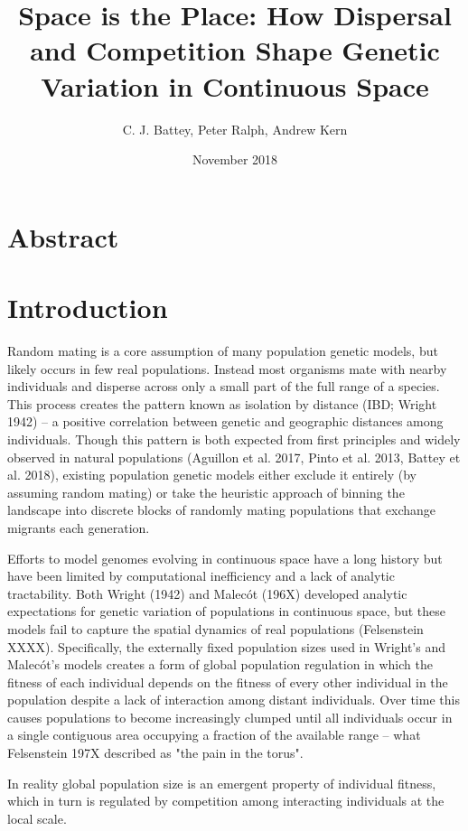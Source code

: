 \documentclass[12pt]{amsart}
\title{ Space is the Place: How Dispersal and Competition Shape Genetic Variation in Continuous Space }
\author{C. J. Battey, Peter Ralph, Andrew Kern}
\date{November 2018} %
\begin{document}
\maketitle
\tableofcontents

\section{Abstract}

\section{Introduction}
Random mating is a core assumption of many population genetic models, but likely occurs in few real populations. Instead most organisms mate with nearby individuals and disperse across only a small part of the full range of a species. This process creates the pattern known as isolation by distance (IBD; Wright 1942) -- a positive correlation between genetic and geographic distances among individuals. Though this pattern is both expected from first principles and widely observed in natural populations (Aguillon et al. 2017, Pinto et al. 2013, Battey et al. 2018), existing population genetic models either exclude it entirely (by assuming random mating) or take the heuristic approach of binning the landscape into discrete blocks of randomly mating populations that exchange migrants each generation. 

Efforts to model genomes evolving in continuous space have a long history but have been limited by computational inefficiency and a lack of analytic tractability. Both Wright (1942) and Malecót (196X) developed analytic expectations for genetic variation of populations in continuous space, but these models fail to capture the spatial dynamics of real populations (Felsenstein XXXX). Specifically, the externally fixed population sizes used in Wright's and Malecót's models creates a form of global population regulation in which the fitness of each individual depends on the fitness of every other individual in the population despite a lack of interaction among distant individuals. Over time this causes populations to become increasingly clumped until all individuals occur in a single contiguous area occupying a fraction of the available range -- what Felsenstein 197X described as "the pain in the torus". 

In reality global population size is an emergent property of individual fitness, which in turn is regulated by competition among interacting individuals at the local scale. 
\end{document}
